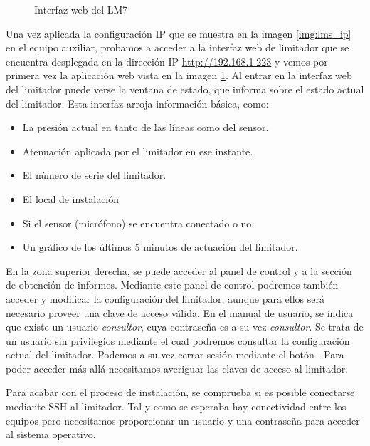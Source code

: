 \begin{figure}[ht]
\begin{minipage}[b]{.45\textwidth}
        \caption{Interfaz web del \acrshort{LM7} \newline\newline}
        \label{img:lms_ui}
    \end{minipage}
\end{figure}

Una vez aplicada la configuración \acrshort{IP} que se muestra en la imagen \ref{img:lms_ip} en el equipo auxiliar, probamos a acceder a la interfaz web de limitador que se encuentra desplegada en la dirección \acrshort{IP}
\href{http://192.168.1.223}{http://192.168.1.223} y vemos por primera vez la aplicación web vista en la imagen \ref{img:lms_ui}. Al entrar en la interfaz web del limitador puede verse la ventana de estado, que informa sobre el estado actual del limitador. Esta interfaz arroja información básica, como:

\begin{itemize}
    \item La presión actual en  tanto de las líneas como del sensor.
    \item Atenuación aplicada por el limitador en ese instante.
    \item El número de serie del limitador.
    \item El local de instalación
    \item Si el sensor (micrófono) se encuentra conectado o no.
    \item Un gráfico de los últimos 5 minutos de actuación del limitador.
\end{itemize}

En la zona superior derecha, se puede acceder al panel de control y a la sección de obtención de informes. Mediante este panel de control podremos también acceder y modificar la configuración del limitador, aunque para ellos será necesario proveer una clave de acceso válida. En el manual de usuario, se indica que existe un usuario \textit{consultor}, cuya contraseña es a su vez \textit{consultor}. Se trata de un usuario sin privilegios mediante el cual podremos consultar la configuración actual del limitador. Podemos a su vez cerrar sesión mediante el botón . Para poder acceder más allá necesitamos averiguar las claves de acceso al limitador.

Para acabar con el proceso de instalación, se comprueba si es posible conectarse mediante \acrshort{SSH} al limitador. Tal y como se esperaba hay conectividad entre los equipos pero necesitamos proporcionar un usuario y una contraseña para acceder al sistema operativo.

